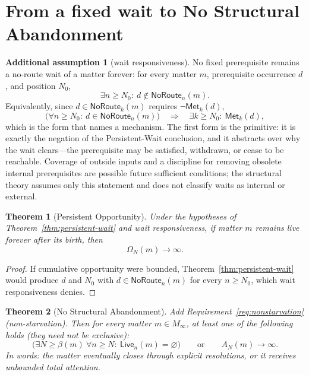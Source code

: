\documentclass[11pt]{article}
\newtheorem{theorem}{Theorem}
\theoremstyle{definition}
\newtheorem*{assumption}{Additional assumption}
\theoremstyle{remark}
\newcommand{\Met}{\mathsf{Met}}
\newcommand{\Live}{\mathsf{Live}}
\newcommand{\NoRoute}{\mathsf{NoRoute}}
\begin{document}
\section{From a fixed wait to No Structural Abandonment}\label{sec:nsa}

\begin{assumption}[wait responsiveness]\label{assump:wait}
No fixed prerequisite remains a no-route wait of a matter forever: for every
matter $m$, prerequisite occurrence $d$, and position $N_0$,
\[
 \exists n\ge N_0:\ d\notin\NoRoute_n(m).
\]
Equivalently, since $d\in\NoRoute_k(m)$ requires $\neg\Met_k(d)$,
\[
 \bigl(\forall n\ge N_0:\ d\in\NoRoute_n(m)\bigr)
 \quad\Longrightarrow\quad
 \exists k\ge N_0:\ \Met_k(d),
\]
which is the form that names a mechanism. The first form is the primitive: it
is exactly the negation of the Persistent-Wait conclusion, and it abstracts
over why the wait clears---the prerequisite may be satisfied, withdrawn, or
cease to be reachable. Coverage of outside inputs and a discipline for removing
obsolete internal prerequisites are possible future sufficient conditions; the
structural theory assumes only this statement and does not classify waits as
internal or external.
\end{assumption}

\begin{theorem}[Persistent Opportunity]\label{thm:persistent-opportunity}
Under the hypotheses of Theorem~\ref{thm:persistent-wait} and wait
responsiveness, if matter $m$ remains live forever after its birth, then
\[
 \Omega_N(m)\to\infty.
\]
\end{theorem}

\begin{proof}
If cumulative opportunity were bounded, Theorem~\ref{thm:persistent-wait}
would produce $d$ and $N_0$ with $d\in\NoRoute_n(m)$ for every $n\ge N_0$,
which wait responsiveness denies.
\end{proof}

\begin{theorem}[No Structural Abandonment]\label{thm:nsa}
Add Requirement~\ref{req:nonstarvation} (non-starvation). Then for every matter
$m\in M_\infty$, at least one of the following holds (they need not be
exclusive):
\[
 \bigl(\exists N\ge\beta(m)\ \forall n\ge N:\ \Live_n(m)=\varnothing\bigr)
 \qquad\text{or}\qquad
 A_N(m)\to\infty.
\]
In words: the matter eventually closes through explicit resolutions, or it
receives unbounded total attention.
\end{theorem}
\end{document}
